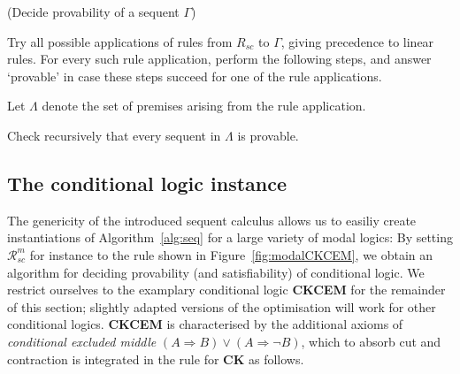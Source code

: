 \documentclass{entcs} \usepackage{entcsmacro}
\begin{document}
\begin{alg}(Decide provability of a sequent $\Gamma$)
\begin{upshape}
 \begin{algenumerate}
   \item Try all possible applications of rules from $R_{sc}$ to $\Gamma$, 
     giving precedence to linear rules. For every such rule application,
     perform the following steps, and answer `provable' in case these steps
     succeed for one of the rule applications.
   \item Let $\Lambda$ denote the  set of premises  arising from the rule 
     application.
   \item Check recursively that every sequent in $\Lambda$ is provable.
  \end{algenumerate}
\end{upshape}
\label{alg:seq}
\end{alg}



\subsection{The conditional logic instance}

The genericity of the introduced sequent calculus allows us to easiliy
create instantiations of Algorithm~\ref{alg:seq} for a large variety
of modal logics: By setting $\mathcal R^m_{sc}$ for instance to the
rule shown in Figure~\ref{fig:modalCKCEM},
we obtain an algorithm for deciding provability (and satisfiability)
of conditional logic. We restrict ourselves to the examplary
conditional logic \textbf{CKCEM} for the remainder of this section;
slightly adapted versions of the optimisation will work for other
conditional logics. \textbf{CKCEM} is characterised by the additional
axioms of \emph{conditional excluded middle} $(A\Rightarrow
B)\lor(A\Rightarrow\neg B)$, which to absorb cut and contraction is
integrated in the rule for \textbf{CK} as follows.
\end{document}
